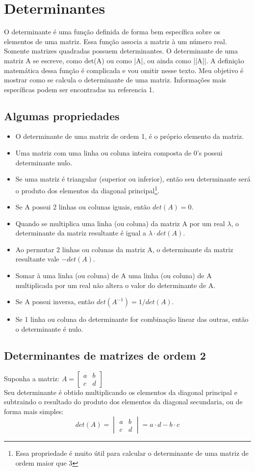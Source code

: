 \section{Determinantes}
\label{sec:det}
   O determinante é uma função definida de forma bem específica sobre os elementos de uma matriz. Essa função
associa a matriz à um número real. Somente matrizes quadradas possuem determinantes.
   O determinante de uma matriz A se escreve, como det(A) ou como |A|, ou ainda como ||A||.
A definição matemática dessa função é complicada e vou omitir nesse texto. Meu objetivo é mostrar como se calcula
 o determinante de uma matriz. Informações mais específicas podem ser encontradas na referencia 1.
   \subsection{Algumas propriedades}
   \begin{itemize}
\label{prop:det}     
     \item O determinante de uma matriz de ordem 1, é o próprio elemento da matriz.
     \item Uma matriz com uma linha ou coluna inteira composta de 0's possui determinante nulo.
     \item Se uma matriz é triangular (superior ou inferior), então seu determinante será o produto dos elementos da diagonal principal\footnote{Essa propriedade é muito útil para calcular o determinante de uma matriz de ordem maior que 3}.
     \item Se A possui 2 linhas ou colunas iguais, então $det(A)=0$.
     \item Quando se multiplica uma linha (ou coluna) da matriz A por um real $\lambda $, o determinante da matriz resultante é igual a $\lambda \cdot det(A)$.
     \item Ao permutar 2 linhas ou colunas da matriz A, o determinante da matriz resultante vale $-det(A)$.
     \item Somar à uma linha (ou coluna) de A uma linha (ou coluna) de A multiplicada por um real não altera o valor do determinante de A.
     \item Se A possui inversa, então $det(A^{-1})=1/det(A)$.
     \item Se 1 linha ou coluna do determinante for combinação linear das outras, então o determinante é nulo.
   \end{itemize}
   \subsection{Determinantes de matrizes de ordem 2}
   Suponha a matriz: $A=\begin{bmatrix}a & b\\c & d\end{bmatrix}$\\
   Seu determinante é obtido multiplicando os elementos da diagonal principal e subtraindo o resultado do produto dos elementos da diagonal secundaria, ou de forma mais simples:\[ det(A)=
   \begin{vmatrix}a & b\\c & d\end{vmatrix}=a\cdot d-b\cdot c\]
   
